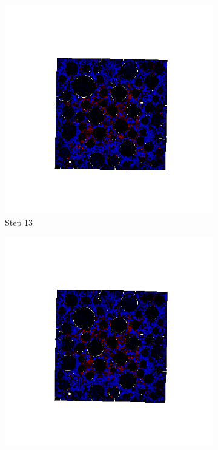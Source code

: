 \begin{figure}[ht!]
      \begin{subfigure}{.25\textwidth}
        \centering
        \includegraphics[width=1.0\linewidth]{Files/A30X0C_3_IS/DEP50-STEP(013).png}
      \caption{Step 13}
      \end{subfigure}%
      \begin{subfigure}{.25\textwidth}
        \centering
        \includegraphics[width=1.0\linewidth]{Files/A30X0C_3_IS/DEP50-STEP(014).png}

\end{subfigure}
\end{figure}
